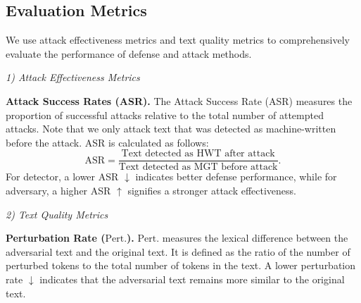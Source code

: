 \begin{table}[h]
    \centering
    \caption{Hyperparameters for our \modelname.}
    \label{tab:hyperparameters}
\end{table}


\subsection{Evaluation Metrics}
\label{apdx:metric}
We use attack effectiveness metrics and text quality metrics to comprehensively evaluate the performance of defense and attack methods.

\noindent\textit{1) Attack Effectiveness Metrics}

\noindent\textbf{Attack Success Rates (ASR).} The Attack Success Rate (ASR) measures the proportion of successful attacks relative to the total number of attempted attacks.
Note that we only attack text that was detected as machine-written before the attack.
ASR is calculated as follows:
\[
\text{ASR} = \frac{\text{Text detected as HWT after attack}}{\text{Text detected as MGT before attack}}.
\]
For detector, a lower ASR \(\downarrow\) indicates better defense performance, while for adversary, a higher ASR \(\uparrow\) signifies a stronger attack effectiveness.

\noindent\textit{2) Text Quality Metrics}

\noindent\textbf{Perturbation Rate  ($\mathrm{Pert.}$).} $\mathrm{Pert.}$ measures the lexical difference between the adversarial text and the original text. 
It is defined as the ratio of the number of perturbed tokens to the total number of tokens in the text. 
A lower perturbation rate \(\downarrow\) indicates that the adversarial text remains more similar to the original text.

